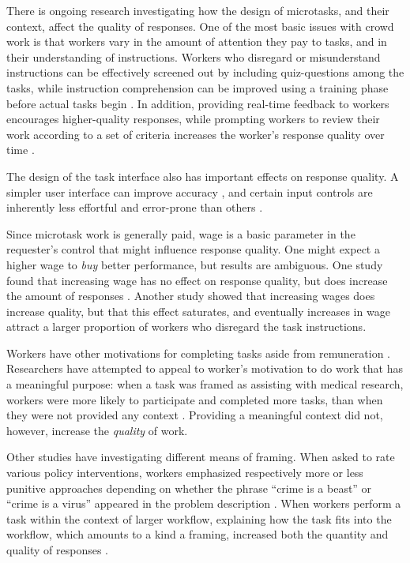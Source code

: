 \documentclass{sigchi}
\begin{document}
There is ongoing research investigating how the design of microtasks,
and their context, affect the quality of responses.  
One of the most basic issues with crowd work
is that workers vary in the amount of attention they pay to tasks, 
and in their understanding of instructions.
Workers who disregard or misunderstand instructions can be effectively 
screened out by including quiz-questions among the tasks, while
instruction comprehension can be improved using a training phase before
actual tasks begin
\cite{le2010ensuring,kazai2013analysis}. %
In addition, providing real-time feedback to workers encourages  
higher-quality responses, while prompting workers to review their work
according to a set of criteria increases the worker's response quality 
over time \cite{Dow20121013}.

The design of the task interface also has important effects on response
quality.  A simpler user interface can improve accuracy 
\cite{Finnerty2013}, and certain input controls
are inherently less effortful and error-prone than others
\cite{cheng2015measuring}.

Since microtask work is generally paid, wage is a basic parameter in
the requester's control that might influence response quality.
One might expect a higher wage to \textit{buy} better performance,
but results are ambiguous.  One study found that increasing wage
has no effect on response quality, but does increase the amount of 
responses \cite{Mason200977}.
Another study \cite{kazai2013analysis} showed that increasing
wages does increase quality, but that this effect saturates, and 
eventually increases in wage attract a larger proportion of workers who 
disregard the task instructions.

Workers have other motivations for completing tasks aside from 
remuneration \cite{kazai2013analysis}.  
Researchers have attempted to appeal to
worker's motivation to do work that has a meaningful purpose:
when a task was framed as assisting with medical research,
workers were more likely to participate and completed more tasks, than
when they were not provided any context \cite{chandler2013breaking}.
Providing a meaningful context did not, however, increase the 
\textit{quality} of work.

Other studies have investigating different means of framing.  
When asked to rate various policy interventions, 
workers emphasized respectively more or less punitive approaches
depending on whether the phrase ``crime is a beast'' or 
``crime is a virus'' appeared in the problem description
\cite{thibodeau2013natural}.
When workers perform a task within the context of larger workflow, 
explaining how the task fits into the workflow, 
which amounts to a kind a framing, increased both the quantity and 
quality of responses \cite{Kinnaird2012281}.
\end{document}
